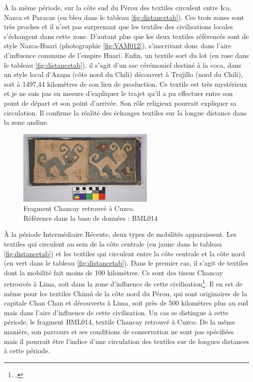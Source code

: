 \noindent À la même période, sur la côte sud du Pérou des textiles circulent entre Ica, Nazca et Paracas (en bleu dans le tableau \ref{fig:distancetab}). Ces trois zones sont très proches et il n'est pas surprenant que les textiles des civilisations locales s'échangent dans cette zone. D'autant plus que les deux textiles référencés sont de style Nazca-Huari (photographie \ref{fig:VAM012}), s'inscrivant donc dans l'aire d'influence commune de l'empire Huari.
Enfin, un textile sort du lot (en rose dans le tableau \ref{fig:distancetab}), il s'agit d'un sac cérémoniel destiné à la coca, dans un style local d'Azapa (côte nord du Chili) découvert à Trujillo (nord du Chili), soit à 1497,44 kilomètres de son lieu de production. Ce textile est très mystérieux et je ne suis pas en mesure d'expliquer le trajet qu'il a pu effectuer entre son point de départ et son point d'arrivée. Son rôle religieux pourrait expliquer sa circulation. Il confirme la réalité des échanges textiles sur la longue distance dans la zone andine.

\begin{figure}
    \centering
    \includegraphics[width=0.6\textwidth]{../images/BML014.jpg}
    \caption{Fragment Chancay retrouvé à Cuzco. \\ Référence dans la base de données : BML014}
    \label{fig:BML014}
\end{figure}

À la période Intermédiaire Récente, deux types de mobilités apparaissent. Les textiles qui circulent au sein de la côte centrale (en jaune dans le tableau \ref{fig:distancetab}) et les textiles qui circulent entre la côte centrale et la côte nord (en vert dans le tableau \ref{fig:distancetab}). Dans le premier cas, il s'agit de textiles dont la mobilité fait moins de 100 kilomètres. Ce sont des tissus Chancay retrouvés à Lima, soit dans la zone d'influence de cette civilisation\footcite[p.~72]{boissiereAtlasAmeriquePrecolombienne2022}.
 Il en est de même pour les textiles Chimú de la côte nord du Pérou, qui sont originaires de la capitale Chan Chan et découverts à Lima, soit près de 500 kilomètres plus au sud mais dans l'aire d'influence de cette civilisation.
Un cas se distingue à cette période, le fragment BML014, textile Chancay retrouvé à Cuzco. De la même manière, son parcours et ses conditions de conservation ne sont pas spécifiées mais il pourrait être l'indice d'une circulation des textiles sur de longues distances à cette période.

